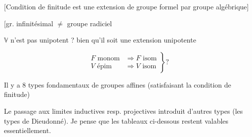 [Condition de finitude est   une extension de groupe formel par groupe algébrique]

[gr. infinitésimal $\ne$ groupe radiciel

$\mathbb V$ n'est pas unipotent ? bien qu'il soit une extension unipotente

\[
\left.\begin{aligned}
F\text{ monom}&\Longrightarrow F\text{ isom}\\
V\text{ épim}&\Longrightarrow V\text{ isom}
\end{aligned}\right\}?
\]

Il y a 8 types fondamentaux de groupes affines (satisfaisant la condition de finitude)

Le passage aux limites inductives resp. projectives introduit d'autres types  (les types de Dieudonné). Je pense que les tableaux ci-dessous restent valables essentiellement.

\diagram{\begin{tikzcd}[ampersand replacement=\&,column sep=5em]
{}\arrow[r,leftrightarrow]\&{}
\end{tikzcd}}


